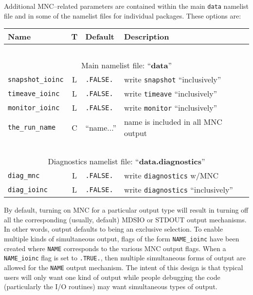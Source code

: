 Additional MNC--related parameters are contained within the main
\texttt{data} namelist file and in some of the namelist files for
individual packages.  These options are:
\begin{center}
  {\footnotesize
    \begin{tabular}[htb]{|l|c|l|l|}\hline
      \textbf{Name}  &  \textbf{T}  &  
      \textbf{Default}  &  \textbf{Description}  \\\hline
      \multicolumn{4}{|c|}{\ }  \\
      \multicolumn{4}{|c|}{Main namelist file: 
        ``\textbf{data}''}  \\\hline
      \texttt{snapshot\_ioinc}  &  L  & \texttt{.FALSE.}  &  
      write \texttt{snapshot} ``inclusively''  \\
      \texttt{timeave\_ioinc}  &  L  & \texttt{.FALSE.}  &  
      write \texttt{timeave} ``inclusively''  \\
      \texttt{monitor\_ioinc}  &  L  & \texttt{.FALSE.}  &  
      write \texttt{monitor} ``inclusively''  \\
      \texttt{the\_run\_name}  &  C  & ``name...''  &  
      name is included in all MNC output  \\\hline
      \multicolumn{4}{|c|}{\ }  \\
      \multicolumn{4}{|c|}{Diagnostics namelist file: 
        ``\textbf{data.diagnostics}''}  \\\hline
      \texttt{diag\_mnc}  &  L  & \texttt{.FALSE.}  &  
      write \texttt{diagnostics} w/MNC  \\
      \texttt{diag\_ioinc}  &  L  & \texttt{.FALSE.}  &  
      write \texttt{diagnostics} ``inclusively''  \\\hline
    \end{tabular}
  }
\end{center}

By default, turning on MNC for a particular output type will result in
turning off all the corresponding (usually, default) MDSIO or STDOUT
output mechanisms.  In other words, output defaults to being an
exclusive selection.  To enable multiple kinds of simultaneous output,
flags of the form \texttt{NAME\_ioinc} have been created where
\texttt{NAME} corresponds to the various MNC output flags.  When a
\texttt{NAME\_ioinc} flag is set to \texttt{.TRUE.}, then multiple
simultaneous forms of output are allowed for the \texttt{NAME} output
mechanism.  The intent of this design is that typical users will only
want one kind of output while people debugging the code (particularly
the I/O routines) may want simultaneous types of output.


